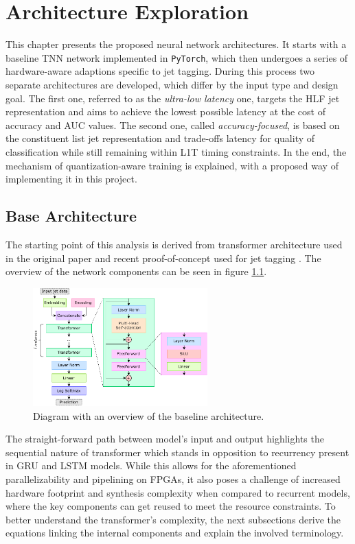 \chapter{Architecture Exploration}\label{models}
This chapter presents the proposed neural network architectures. It starts with a baseline TNN network implemented in \texttt{PyTorch}, which then undergoes a series of hardware-aware adaptions specific to jet tagging. During this process two separate architectures are developed, which differ by the input type and design goal. The first one, referred to as the \textit{ultra-low latency} one, targets the HLF jet representation and aims to achieve the lowest possible latency at the cost of accuracy and AUC values. The second one, called \textit{accuracy-focused}, is based on the constituent list jet representation and trade-offs latency for quality of classification while still remaining within L1T timing constraints. In the end, the mechanism of quantization-aware training is explained, with a proposed way of implementing it in this project.


\section{Base Architecture}
The starting point of this analysis is derived from transformer architecture used in the original paper \cite{44-vaswani2017attention} and recent proof-of-concept used for jet tagging \cite{3-yuan2021constituentnet:}. The overview of the network components can be seen in figure \ref{fig:constituent-net}.

\begin{figure}[hpt!]
  \centering
  \includegraphics[trim={0cm 0cm 0cm 0cm}, width=0.6\textwidth, center]{models/constituent_net.pdf}
  \caption{Diagram with an overview of the baseline architecture.}
  \label{fig:constituent-net}
\end{figure}

The straight-forward path between model's input and output highlights the sequential nature of transformer which stands in opposition to recurrency present in GRU and LSTM models. While this allows for the aforementioned parallelizability and pipelining on FPGAs, it also poses a challenge of increased hardware footprint and synthesis complexity when compared to recurrent models, where the key components can get reused to meet the resource constraints. To better understand the transformer's complexity, the next subsections derive the equations linking the internal components and explain the involved terminology.


